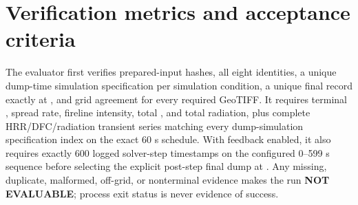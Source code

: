 \section{Verification metrics and acceptance criteria}
The evaluator first verifies prepared-input hashes, all eight identities, a
unique dump-time simulation specification per simulation condition, a unique final record exactly at
\StopTime{}, and grid agreement for every required GeoTIFF.  It requires
 terminal \TOA{}, spread rate, fireline intensity, total \DFC{}, and total
 radiation, plus complete HRR/DFC/radiation transient series matching every
 dump-simulation specification index on the exact 60 s schedule.  With feedback enabled, it
 also requires exactly 600 logged solver-step timestamps on the configured
 0--599 s sequence before selecting the explicit post-step final dump at
 \StopTime{}.  Any missing,
duplicate, malformed, off-grid, or nonterminal evidence makes the run
\textbf{NOT EVALUABLE}; process exit status is never evidence of success.


